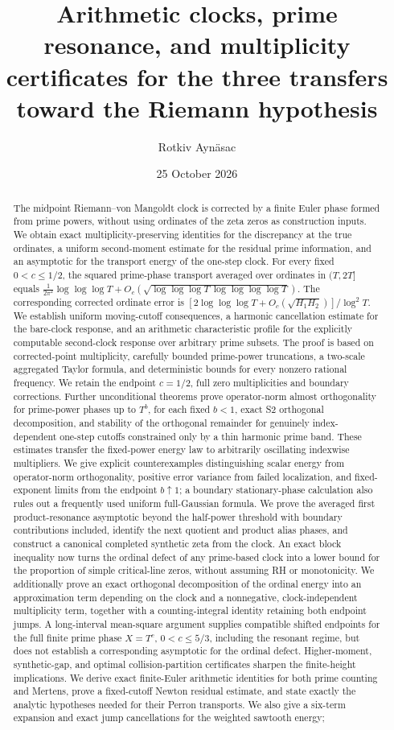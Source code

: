 \documentclass[11pt,reqno]{amsart}
\title[Arithmetic clock, multiplicity and RH transfers]{Arithmetic clocks, prime resonance, and multiplicity certificates for the three transfers toward the Riemann hypothesis}
\author{Rotkiv Ayn\"asac}
\date{25 October 2026}
\numberwithin{equation}{section}
\begin{document}
\begin{abstract}
The midpoint Riemann--von Mangoldt clock is corrected by a finite Euler phase formed from prime powers, without using ordinates of the zeta zeros as construction inputs. We obtain exact multiplicity-preserving identities for the discrepancy at the true ordinates, a uniform second-moment estimate for the residual prime information, and an asymptotic for the transport energy of the one-step clock. For every fixed $0<c\le1/2$, the squared prime-phase transport averaged over ordinates in $(T,2T]$ equals $\frac1{2\pi^2}\log\log\log T+O_c(\sqrt{\log\log\log T\,\log\log\log\log T})$. The corresponding corrected ordinate error is $[2\log\log\log T+O_c(\sqrt{H_1H_2})]/\log^2T$. We establish uniform moving-cutoff consequences, a harmonic cancellation estimate for the bare-clock response, and an arithmetic characteristic profile for the explicitly computable second-clock response over arbitrary prime subsets. The proof is based on corrected-point multiplicity, carefully bounded prime-power truncations, a two-scale aggregated Taylor formula, and deterministic bounds for every nonzero rational frequency. We retain the endpoint $c=1/2$, full zero multiplicities and boundary corrections. Further unconditional theorems prove operator-norm almost orthogonality for prime-power phases up to $T^b$, for each fixed $b<1$, exact S2 orthogonal decomposition, and stability of the orthogonal remainder for genuinely index-dependent one-step cutoffs constrained only by a thin harmonic prime band. These estimates transfer the fixed-power energy law to arbitrarily oscillating indexwise multipliers. We give explicit counterexamples distinguishing scalar energy from operator-norm orthogonality, positive error variance from failed localization, and fixed-exponent limits from the endpoint $b\uparrow1$; a boundary stationary-phase calculation also rules out a frequently used uniform full-Gaussian formula. We prove the averaged first product-resonance asymptotic beyond the half-power threshold with boundary contributions included, identify the next quotient and product alias phases, and construct a canonical completed synthetic zeta from the clock. An exact block inequality now turns the ordinal defect of any prime-based clock into a lower bound for the proportion of simple critical-line zeros, without assuming RH or monotonicity. We additionally prove an exact orthogonal decomposition of the ordinal energy into an approximation term depending on the clock and a nonnegative, clock-independent multiplicity term, together with a counting-integral identity retaining both endpoint jumps. A long-interval mean-square argument supplies compatible shifted endpoints for the full finite prime phase $X=T^c$, $0<c\le5/3$, including the resonant regime, but does not establish a corresponding asymptotic for the ordinal defect. Higher-moment, synthetic-gap, and optimal collision-partition certificates sharpen the finite-height implications. We derive exact finite-Euler arithmetic identities for both prime counting and Mertens, prove a fixed-cutoff Newton residual estimate, and state exactly the analytic hypotheses needed for their Perron transports. We also give a six-term expansion and exact jump cancellations for the weighted sawtooth energy; 
\end{abstract}
\end{document}
